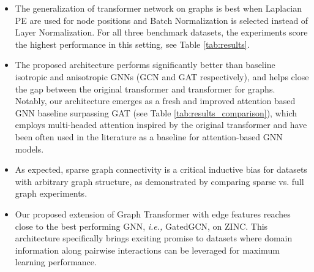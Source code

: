 \documentclass[letterpaper]{article} %
\begin{document}
\begin{itemize}
    \item The generalization of transformer network on graphs is best when Laplacian PE are used for node positions and Batch Normalization is selected instead of Layer Normalization. For all three benchmark datasets, the experiments score the highest performance in this setting, see Table \ref{tab:results}.
    \item The proposed architecture performs significantly better than baseline isotropic and anisotropic GNNs (GCN and GAT respectively), and helps close the gap between the original transformer and transformer for graphs. Notably, our architecture emerges as a fresh and improved attention based GNN baseline surpassing GAT (see Table \ref{tab:results_comparison}), which employs multi-headed attention inspired by the original transformer  \cite{vaswani2017attention} and have been often used in the literature as a baseline for attention-based GNN models.
    \item As expected, sparse graph connectivity is a critical inductive bias for datasets with arbitrary graph structure, as demonstrated by comparing sparse vs. full graph experiments. 
    \item Our proposed extension of Graph Transformer with edge features reaches close to the best performing GNN, \textit{i.e.,} GatedGCN, on ZINC. This architecture specifically brings exciting promise to datasets where domain information along pairwise interactions can be leveraged for maximum learning performance.
\end{itemize}
\end{document}

